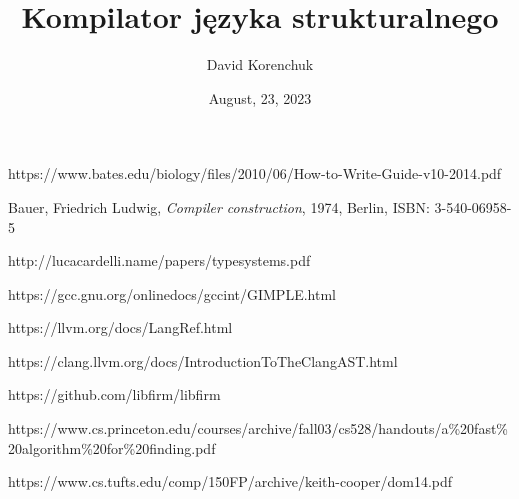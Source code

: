\documentclass[leqno, 12pt]{article}
\title{Kompilator języka strukturalnego}
\author{David Korenchuk}
\date{August, 23, 2023}
\begin{document}
    \pagestyle{fancy}
    \lhead{\leftmark}
    \rhead{\thetitle}

    \setlength{\parindent}{0pt}

    \maketitle

	
	
	\newpage
	
	\newpage
	
	
	
	
	
	
	
	
	\newpage
	
	\newpage

	\begin{thebibliography}{9}
			https://www.bates.edu/biology/files/2010/06/How-to-Write-Guide-v10-2014.pdf

			Bauer, Friedrich Ludwig,
			\emph{Compiler construction},
			1974, Berlin,
			ISBN: 3-540-06958-5

			http://lucacardelli.name/papers/typesystems.pdf

			https://gcc.gnu.org/onlinedocs/gccint/GIMPLE.html

			https://llvm.org/docs/LangRef.html

			https://clang.llvm.org/docs/IntroductionToTheClangAST.html

			https://github.com/libfirm/libfirm

		    https://www.cs.princeton.edu/courses/archive/fall03/cs528/handouts/a\%20fast\%20algorithm\%20for\%20finding.pdf

	        https://www.cs.tufts.edu/comp/150FP/archive/keith-cooper/dom14.pdf
	\end{thebibliography}

	\newpage

    \tableofcontents
\end{document}

